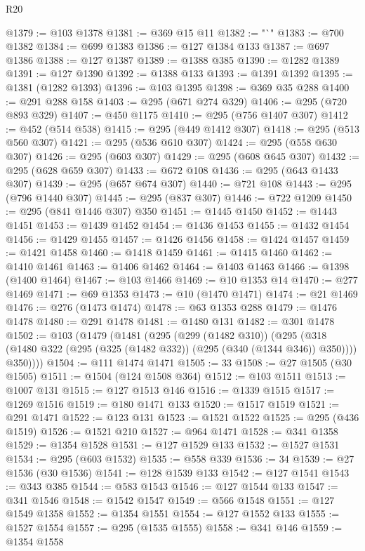 \begin{lexlean}{R20}
\begin{coremodule}
@1379 := @103 @1378
@1381 := @369 @15 @11
@1382 := "`"
@1383 := @700 @1382
@1384 := @699 @1383
@1386 := @127 @1384 @133
@1387 := @697 @1386
@1388 := @127 @1387
@1389 := @1388 @385
@1390 := @1282 @1389
@1391 := @127 @1390
@1392 := @1388 @133
@1393 := @1391 @1392
@1395 := @1381 (@1282 @1393)
@1396 := @103 @1395
@1398 := @369 @35 @288
@1400 := @291 @288 @158
@1403 := @295 (@671 @274 @329)
@1406 := @295 (@720 @893 @329)
@1407 := @450 @1175
@1410 := @295 (@756 @1407 @307)
@1412 := @452 (@514 @538)
@1415 := @295 (@449 @1412 @307)
@1418 := @295 (@513 @560 @307)
@1421 := @295 (@536 @610 @307)
@1424 := @295 (@558 @630 @307)
@1426 := @295 (@603 @307)
@1429 := @295 (@608 @645 @307)
@1432 := @295 (@628 @659 @307)
@1433 := @672 @108
@1436 := @295 (@643 @1433 @307)
@1439 := @295 (@657 @674 @307)
@1440 := @721 @108
@1443 := @295 (@796 @1440 @307)
@1445 := @295 (@837 @307)
@1446 := @722 @1209
@1450 := @295 (@841 @1446 @307) @350
@1451 := @1445 @1450
@1452 := @1443 @1451
@1453 := @1439 @1452
@1454 := @1436 @1453
@1455 := @1432 @1454
@1456 := @1429 @1455
@1457 := @1426 @1456
@1458 := @1424 @1457
@1459 := @1421 @1458
@1460 := @1418 @1459
@1461 := @1415 @1460
@1462 := @1410 @1461
@1463 := @1406 @1462
@1464 := @1403 @1463
@1466 := @1398 (@1400 @1464)
@1467 := @103 @1466
@1469 := @10 @1353 @14
@1470 := @277 @1469
@1471 := @69 @1353
@1473 := @10 (@1470 @1471)
@1474 := @21 @1469
@1476 := @276 (@1473 @1474)
@1478 := @63 @1353 @288
@1479 := @1476 @1478
@1480 := @291 @1478
@1481 := @1480 @131
@1482 := @301 @1478
@1502 := @103
    (@1479
      (@1481
        (@295
          (@299 (@1482 @310))
          (@295
            (@318 (@1480 @322 (@295 (@325 (@1482 @332)) (@295 (@340 (@1344 @346)) @350))))
            @350))))
@1504 := @111 @1474 @1471
@1505 := 33
@1508 := @27 @1505 (@30 @1505)
@1511 := @1504 (@124 @1508 @364)
@1512 := @103 @1511
@1513 := @1007 @131
@1515 := @127 @1513 @146
@1516 := @1339 @1515
@1517 := @1269 @1516
@1519 := @180 @1471 @133
@1520 := @1517 @1519
@1521 := @291 @1471
@1522 := @123 @131
@1523 := @1521 @1522
@1525 := @295 (@436 @1519)
@1526 := @1521 @210
@1527 := @964 @1471
@1528 := @341 @1358
@1529 := @1354 @1528
@1531 := @127 @1529 @133
@1532 := @1527 @1531
@1534 := @295 (@603 @1532)
@1535 := @558 @339
@1536 := 34
@1539 := @27 @1536 (@30 @1536)
@1541 := @128 @1539 @133
@1542 := @127 @1541
@1543 := @343 @385
@1544 := @583 @1543
@1546 := @127 @1544 @133
@1547 := @341 @1546
@1548 := @1542 @1547
@1549 := @566 @1548
@1551 := @127 @1549 @1358
@1552 := @1354 @1551
@1554 := @127 @1552 @133
@1555 := @1527 @1554
@1557 := @295 (@1535 @1555)
@1558 := @341 @146
@1559 := @1354 @1558

\end{coremodule}
\end{lexlean}
